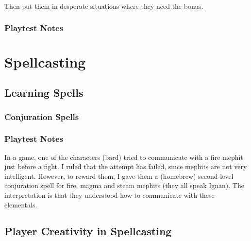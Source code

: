 \documentclass[twocolumn]{dndbook}
\begin{document}
Then put them in desperate situations where they need the bonus.\par



\subsection{Playtest Notes}



\chapter{Spellcasting}
\section{Learning Spells}

\subsection{Conjuration Spells}




\subsection{Playtest Notes}

In a game, one of the characters (bard) tried to communicate with a fire mephit just before a fight.
I ruled that the attempt has failed, since mephits are not very intelligent.
However, to reward them, I gave them a (homebrew) second-level conjuration spell for fire, magma and steam mephits (they all speak Ignan).
The interpretation is that they understood how to communicate with these elementals.\par

\section{Player Creativity in Spellcasting}
\end{document}
